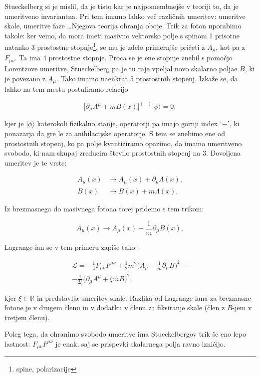 \documentclass[a4paper, twocolumn, titlepage]{article}
\begin{document}
Stueckelberg si je mislil, da je tisto kar je najpomembnej\v se v teoriji to, da je umeritveno invariantna. Pri tem imamo
lahko ve\v c razli\v cnih umeritev: umeritve skale, umeritve faze \ldots Njegova teorija ohranja oboje. Trik za foton
uporabimo takole: ker vemo, da mora imeti masivno vektorsko polje s spinom 1 prisotne natanko 3 prostostne
stopnje\footnote{spine, polarizacije}, se mu je zdelo primernj\v se pri\v ceti z $A_\mu$, kot pa z $F_{\mu\nu}$. Ta ima
4 prostostne stopnje. Proca se je ene stopnje znebil s pomo\v cjo Lorentzove umeritve, Stueckelberg pa je tu raje vpeljal
novo skalarno poljae $B$, ki je povezano z $A_\mu$. Tako imamo naenkrat 5 prostostnih stopenj. Izka\v ze se, da lahko na
tem mestu postuliramo relacijo

\[
	\big[\partial_\mu A^\mu + mB(x)\big]^{(-)}|\phi\rangle = 0,
\]

kjer je $|\phi\rangle$ katerokoli fizikalno stanje, operatorji pa imajo gornji index `$-$', ki ponazarja da gre le za
anihilacijske operatorje. S tem se znebimo ene od prostostnih stopenj, ko pa polje kvantiziramo opazimo, da imamo
umeritveno svobodo, ki nam skupaj zreducira \v stevilo prostostnih stopenj na 3. Dovoljena umeritev je te vrste:

\begin{align*}
	A_\mu (x) &\to A_\mu (x) + \partial_\mu \Lambda (x), \\
	B (x) &\to B (x) + m\Lambda(x).
\end{align*}

Iz brezmasnega do masivnega fotona torej pridemo s tem trikom:

\begin{equation}
	A_\mu (x) \to A_\mu (x) - \frac{1}{m}\partial_\mu B(x),
\end{equation}

Lagrange-ian se v tem primeru zapi\v se tako:

\begin{multline}
	\mathcal{L} = -\frac{1}{4}F_{\mu\nu}F^{\mu\nu} + \frac{1}{2}m^2\Big(A_\mu - \frac{1}{m}\partial_\mu B\Big)^2 -\\-
		\frac{1}{2\xi}\big(\partial_\mu A^\mu + \xi mB\big)^2,
\end{multline}

kjer $\xi \in \mathbb{R}$ in predstavlja umeritev skale. Razlika od Lagrange-iana za brezmasne fotone je v drugem
\v clenu in v dodatku v \v clenu za fiksiranje skale (\v clen z $B$-jem v tretjem \v clenu).

Poleg tega, da ohranimo svobodo umeritve ima Stueckelbergov trik \v se eno lepo lastnost: $F_{\mu\nu} F^{\mu\nu}$ je enak,
saj se prispevki skalarnega polja ravno izni\v cijo.
\end{document}
